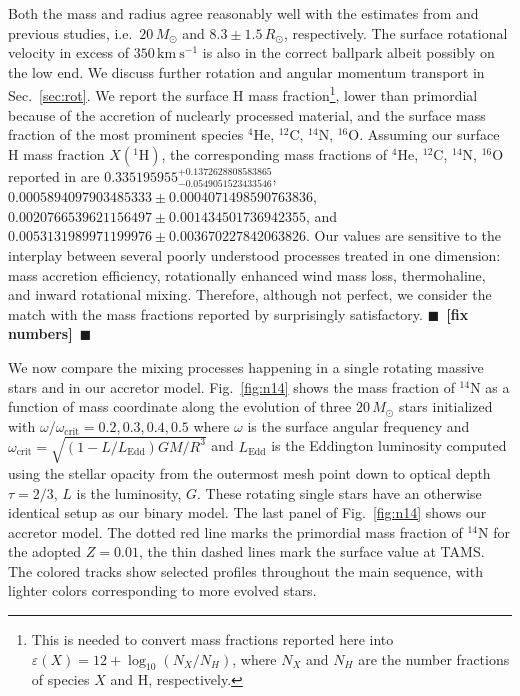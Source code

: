 \documentclass[twocolumn,twocolappendix,trackchanges]{aastex63}
\newcommand{\kms}{{\mathrm{km\ s^{-1}}}}
\DeclareRobustCommand{\Figref}[1]{Fig.~\ref{#1}}
\DeclareRobustCommand{\Secref}[1]{Sec.~\ref{#1}}
\newcommand{\todo}[1]{{\large $\blacksquare$~\textbf{\color{red}[#1]}}~$\blacksquare$}
\begin{document}
Both the mass and radius agree reasonably well with the estimates from
 and previous studies, i.e.~$20\,M_\odot$ and
$8.3\pm1.5\,R_\odot$, respectively. The surface rotational velocity in
excess of $350\,\kms$ is also in the correct ballpark albeit possibly
on the low end. We discuss further rotation and angular momentum
transport in \Secref{sec:rot}. We report the surface H mass
fraction\footnote{This is needed to convert mass fractions reported
  here into $\varepsilon(X)=12+\log_{10}(N_X/N_H)$, where $N_X$ and
  $N_H$ are the number fractions of species $X$ and H, respectively.},
lower than primordial because of the accretion of nuclearly processed
material, and the surface mass fraction of the most prominent species
$^4\mathrm{He}$, $^{12}\mathrm{C}$, $^{14}\mathrm{N}$,
$^{16}\mathrm{O}$.  Assuming our surface H mass fraction
$X(^1\mathrm{H})$, the corresponding mass fractions of $^4\mathrm{He}$,
$^{12}\mathrm{C}$, $^{14}\mathrm{N}$, $^{16}\mathrm{O}$ reported in
 are
$0.335195955^{+0.1372628808583865}_{-0.0549051523433546}$,
$0.0005894097903485333\pm0.0004071498590763836$,
$0.0020766539621156497\pm0.001434501736942355$, and
$0.0053131989971199976\pm0.003670227842063826$.  Our values are
sensitive to the interplay between several poorly understood
processes treated in one dimension: mass accretion efficiency, rotationally enhanced wind mass
loss, thermohaline, and inward rotational mixing. Therefore, although
not perfect, we consider the match with the mass fractions reported by
 surprisingly satisfactory. \todo{fix numbers}

We now compare the mixing processes
happening in a single rotating massive stars and in our accretor
model. \Figref{fig:n14} shows the mass fraction of $^{14}\mathrm{N}$
as a function of mass coordinate along the evolution of three
$20\,M_\odot$ stars initialized with
$\omega/\omega_\mathrm{crit}=0.2,0.3,0.4,0.5$ where $\omega$ is the
surface angular frequency and
$\omega_\mathrm{crit}=\sqrt{(1-L/L_\mathrm{Edd})GM/R^3}$ and
$L_\mathrm{Edd}$ is the Eddington luminosity computed using the
stellar opacity from the outermost mesh point down to optical depth
$\tau=2/3$, $L$ is the luminosity, $G$. These rotating single stars have an otherwise identical
setup as our binary model. The last panel of \Figref{fig:n14} shows
our accretor model. The dotted red line marks the primordial mass
fraction of $^{14}\mathrm{N}$ for the adopted $Z=0.01$, the thin
dashed lines mark the surface value at TAMS. The colored tracks show
selected profiles throughout the main sequence, with lighter colors
corresponding to more evolved stars.
\end{document}
